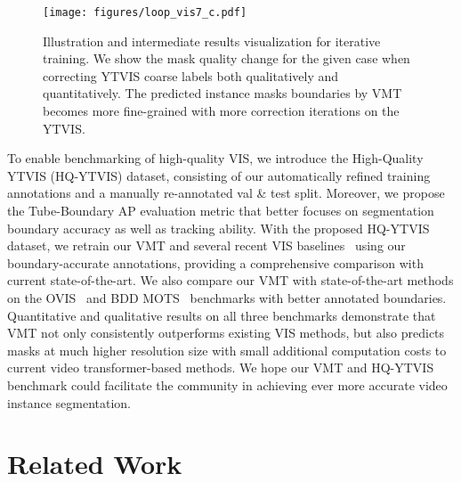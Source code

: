 \documentclass[runningheads]{llncs}
\begin{document}
\begin{figure}[!t]
	\centering
\texttt{[image: figures/loop\_vis7\_c.pdf]}
\caption{Illustration and intermediate results visualization for iterative training. We show the mask quality change for the given case when correcting YTVIS coarse labels both qualitatively and quantitatively. The predicted instance masks boundaries by VMT becomes more fine-grained with more correction iterations on the YTVIS.}
\label{fig:loop}
\end{figure}

To enable benchmarking of high-quality VIS, we introduce the High-Quality YTVIS (HQ-YTVIS) dataset, consisting of our automatically refined training annotations and a manually re-annotated val \& test split.
Moreover, we propose the Tube-Boundary AP evaluation metric that better focuses on segmentation boundary accuracy as well as tracking ability. 
With the proposed HQ-YTVIS dataset, we retrain our VMT and several recent VIS baselines~\cite{yang2019video, wang2020end, pcan, Yang_2021_ICCV,Fang_2021_ICCV,hwang2021video} using our boundary-accurate annotations, providing a comprehensive comparison with current state-of-the-art. We also compare our VMT with state-of-the-art methods on the OVIS~\cite{qi2021occluded} and BDD MOTS~\cite{bdd100k} benchmarks with better annotated boundaries. Quantitative and qualitative results on all three benchmarks demonstrate that VMT not only consistently outperforms existing VIS methods, but also predicts masks at much higher resolution size with small additional computation costs to current video transformer-based methods. We hope our VMT and HQ-YTVIS benchmark could facilitate the community in achieving ever more accurate video instance segmentation.
 \section{Related Work}
\end{document}

